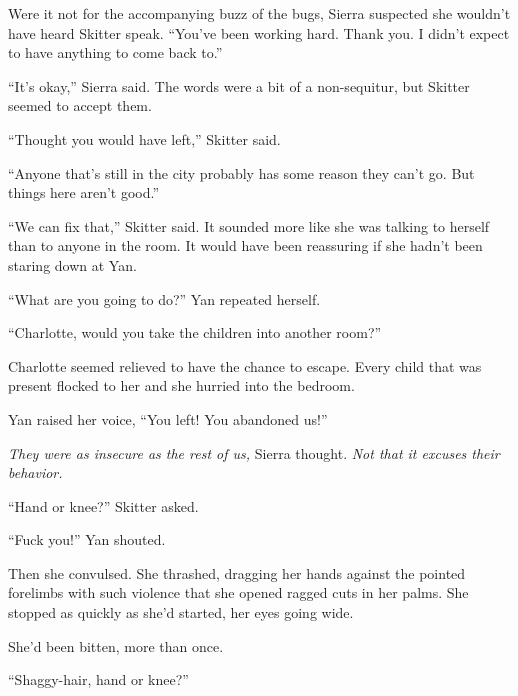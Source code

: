 Were it not for the accompanying buzz of the bugs, Sierra suspected she wouldn't have heard Skitter speak.  ``You've been working hard.  Thank you.  I didn't expect to have anything to come back to.''



``It's okay,'' Sierra said.  The words were a bit of a non-sequitur, but Skitter seemed to accept them.



``Thought you would have left,'' Skitter said.



``Anyone that's still in the city probably has some reason they can't go.  But things here aren't good.''



``We can fix that,'' Skitter said.  It sounded more like she was talking to herself than to anyone in the room.  It would have been reassuring if she hadn't been staring down at Yan.



``What are you going to do?'' Yan repeated herself.



``Charlotte, would you take the children into another room?''



Charlotte seemed relieved to have the chance to escape.  Every child that was present flocked to her and she hurried into the bedroom.



Yan raised her voice, ``You left!  You abandoned us!''



\emph{They were as insecure as the rest of us,} Sierra thought.  \emph{Not that it excuses their behavior.}



``Hand or knee?'' Skitter asked.



``Fuck you!''  Yan shouted.



Then she convulsed.  She thrashed, dragging her hands against the pointed forelimbs with such violence that she opened ragged cuts in her palms.  She stopped as quickly as she'd started, her eyes going wide.



She'd been bitten, more than once.



``Shaggy-hair, hand or knee?''



